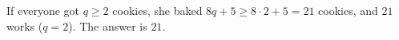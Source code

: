 If everyone got $q\ge2$ cookies, she baked $8q+5\ge8\cdot2+5=21$ cookies, and $21$ works ($q=2$). The answer is $\boxed{21}$.
